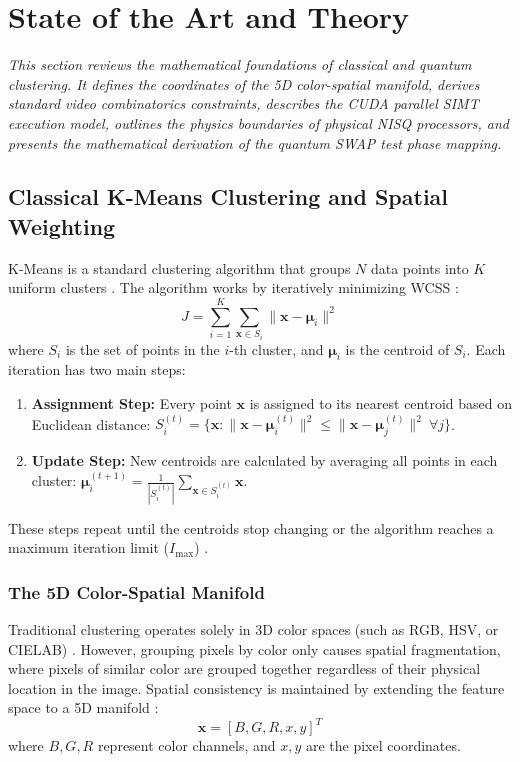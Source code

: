 \chapter{State of the Art and Theory}\label{chap:2}
{\itshape This section reviews the mathematical foundations of classical and quantum clustering. It defines the coordinates of the 5D color-spatial manifold, derives standard video combinatorics constraints, describes the CUDA parallel SIMT execution model, outlines the physics boundaries of physical NISQ processors, and presents the mathematical derivation of the quantum SWAP test phase mapping.}

\section{Classical K-Means Clustering and Spatial Weighting}
K-Means is a standard clustering algorithm that groups $N$ data points into $K$ uniform clusters \cite{lloyd1982least}. The algorithm works by iteratively minimizing WCSS \cite{krzanowski1988criterion}:
\begin{equation}
\label{eq:wcss}
J = \sum_{i=1}^{K} \sum_{\mathbf{x} \in S_i} \|\mathbf{x} - \boldsymbol{\mu}_i\|^2
\end{equation}
where $S_i$ is the set of points in the $i$-th cluster, and $\boldsymbol{\mu}_i$ is the centroid of $S_i$. Each iteration has two main steps:
\begin{enumerate}
    \item \textbf{Assignment Step:} Every point $\mathbf{x}$ is assigned to its nearest centroid based on Euclidean distance: $S_i^{(t)} = \{ \mathbf{x} : \|\mathbf{x} - \boldsymbol{\mu}_i^{(t)}\|^2 \le \|\mathbf{x} - \boldsymbol{\mu}_j^{(t)}\|^2 \ \forall j \}$.
    \item \textbf{Update Step:} New centroids are calculated by averaging all points in each cluster: $\boldsymbol{\mu}_i^{(t+1)} = \frac{1}{|S_i^{(t)}|} \sum_{\mathbf{x} \in S_i^{(t)}} \mathbf{x}$.
\end{enumerate}
These steps repeat until the centroids stop changing or the algorithm reaches a maximum iteration limit ($I_{\text{max}}$) \cite{lloyd1982least}.

\subsection{The 5D Color-Spatial Manifold}\label{subsect:manifold}
Traditional clustering operates solely in 3D color spaces (such as RGB, HSV, or CIELAB) \cite{gonzalez2009digital,szeliski2022computer}. However, grouping pixels by color only causes spatial fragmentation, where pixels of similar color are grouped together regardless of their physical location in the image. Spatial consistency is maintained by extending the feature space to a 5D manifold \cite{comaniciu2002mean,achanta2012slic}:
\begin{equation}
\mathbf{x} = [B, G, R, x, y]^T
\end{equation}
where $B, G, R$ represent color channels, and $x, y$ are the pixel coordinates.

